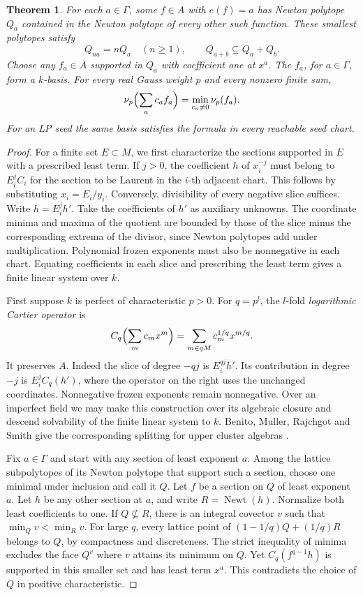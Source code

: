 \documentclass[11pt,reqno]{amsart}
\numberwithin{equation}{section}
\newtheorem{theorem}{Theorem}[section]
\theoremstyle{definition}
\theoremstyle{remark}
\DeclareMathOperator{\Newt}{Newt}
\begin{document}
\begin{theorem}\label{thm:minimum-source-newton-polytope}
For each \(a\in\Gamma\), some \(f\in A\) with \(e(f)=a\) has Newton
polytope \(Q_a\) contained in the Newton polytope of every other such
function. These smallest polytopes satisfy
\[ Q_{na}=nQ_a\quad(n\ge1),\qquad Q_{a+b}\subseteq Q_a+Q_b . \]
Choose any \(f_a\in A\) supported in \(Q_a\) with coefficient one
at \(x^a\). The \(f_a\), for \(a\in\Gamma\), form a \(k\)-basis.
For every real Gauss weight \(p\) and every nonzero finite sum,
\[ \nu_p\Bigl(\sum_a c_a f_a\Bigr)=\min_{c_a\ne0}\nu_p(f_a). \]
For an LP seed the same basis satisfies the formula in every
reachable seed chart.
\end{theorem}
\begin{proof}
For a finite set \(E\subset M\), we first characterize the sections
supported in \(E\) with a prescribed least term. If \(j>0\), the
coefficient \(h\) of \(x_i^{-j}\) must belong to \(E_i^j C_i\) for
the section to be Laurent in the \(i\)-th adjacent chart. This follows
by substituting \(x_i=E_i/y_i\). Conversely, divisibility of
every negative slice suffices. Write \(h=E_i^j h'\).
Take the coefficients of \(h'\) as auxiliary unknowns. The
coordinate minima and maxima of the quotient are bounded by those
of the slice minus the corresponding extrema of the divisor,
since Newton polytopes add under multiplication. Polynomial
frozen exponents must also be nonnegative in each chart.
Equating coefficients in each slice and prescribing the least term
gives a finite linear system over \(k\).

First suppose \(k\) is perfect of characteristic \(p>0\).
For \(q=p^l\), the \(l\)-fold \emph{logarithmic Cartier operator} is
\[ C_q\Bigl(\sum_m c_mx^m\Bigr)=\sum_{m\in qM}c_m^{1/q}x^{m/q}. \]
It preserves \(A\). Indeed the slice of degree \(-qj\) is
\(E_i^{qj}h'\). Its contribution in degree \(-j\) is
\(E_i^j C_q(h')\), where the operator on the right uses
the unchanged coordinates. Nonnegative frozen exponents remain
nonnegative. Over an imperfect field we may make this construction
over its algebraic closure and descend solvability of the finite
linear system to \(k\). Benito, Muller, Rajchgot and Smith give the
corresponding splitting for upper cluster algebras \cite{BMRS}.

Fix \(a\in\Gamma\) and start with any section of least exponent \(a\).
Among the lattice subpolytopes of its Newton polytope that support
such a section, choose one minimal under inclusion and call it \(Q\).
Let \(f\) be a section on \(Q\) of least exponent \(a\).
Let \(h\) be any other section at \(a\), and write
\(R=\Newt(h)\). Normalize both least coefficients to one. If
\(Q\not\subseteq R\), there is an integral covector \(v\) such
that \(\min_Q v<\min_R v\). For large \(q\), every lattice point of
\((1-1/q)Q+(1/q)R\) belongs to \(Q\), by compactness and discreteness.
The strict inequality of minima excludes the face \(Q^v\) where
\(v\) attains its minimum on \(Q\).
Yet \(C_q(f^{q-1}h)\) is supported in this smaller set and has least
term \(x^a\). This contradicts the choice of
\(Q\) in positive characteristic.


\end{proof}
\end{document}
